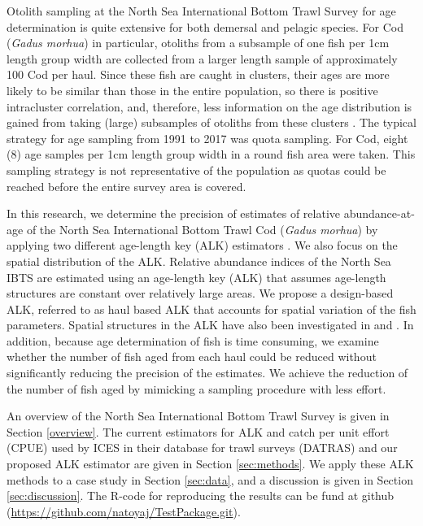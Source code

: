 \documentclass[a4paper 12pt]{article}
\numberwithin{equation}{section}
\newcommand{\natty}[1]{\textcolor{magenta}{#1}}
\begin{document}
 Otolith sampling at the North Sea International Bottom Trawl Survey for age determination is quite extensive for both demersal and pelagic species. For  Cod (\textit{Gadus morhua}) in particular, otoliths from a subsample of one fish per 1cm length group width are collected from a larger length sample of approximately 100 Cod per haul. Since these fish are caught in clusters, their ages are more likely to be similar than those in the entire population, so there is positive intracluster correlation, and, therefore, less information on the age distribution is gained from taking (large) subsamples of otoliths from these clusters \citep{pennington1994assessing,aanes2015efficient}. The typical strategy for age sampling from 1991 to 2017 was quota sampling. For Cod, eight (8) age samples per 1cm length group width in a round fish area were taken. This sampling strategy is not representative of the population as quotas could be reached before the entire survey area is covered. 

In this research, we determine the precision of estimates of relative abundance-at-age of the North Sea International Bottom Trawl Cod (\textit{Gadus morhua}) by applying two different age-length key (ALK) estimators \citep{fridriksson1934calculation}. We also focus on the spatial distribution of the ALK. Relative abundance indices of the North Sea IBTS are estimated using an age-length key (ALK) that assumes age-length structures are constant over relatively large areas. We propose a design-based ALK, referred to as haul based ALK that accounts for spatial variation of the fish parameters. Spatial structures in the ALK have also been investigated in \citet{berg2012spatial} and  \citet{hirst2012bayesian}. In addition, because age determination of fish is time consuming, we examine whether the number of fish aged from each haul could be reduced without significantly reducing the
precision of the estimates. We achieve the reduction of the number of fish aged by mimicking a sampling procedure with less effort.

An  overview of the  North Sea International Bottom Trawl Survey is given in Section \ref{overview}. The current estimators for ALK and catch per unit effort (CPUE) used by ICES in their database for trawl surveys (DATRAS) and our proposed ALK estimator are given in Section \ref{sec:methods}. We apply these ALK methods to a case study in Section  \ref{sec:data}, and a discussion is given in Section \ref{sec:discussion}. The R-code for reproducing the results can be fund at github (\href{https://github.com/natoyaj/TestPackage.git}{https://github.com/natoyaj/TestPackage.git}). %
 
\end{document}
